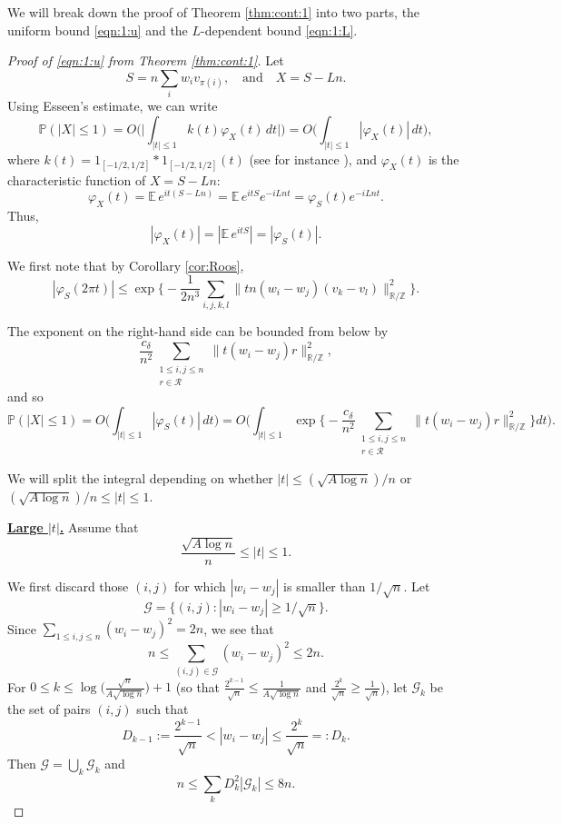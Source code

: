 \documentclass[reqno]{amsart}
\newcommand\R{{\mathbb{R}}}
\newcommand\Z{{\mathbb{Z}}}
\renewcommand\P{{\mathbb{P}}}
\newcommand\CG{{\mathcal G}}
\newcommand\CR{{\mathcal R}}
\theoremstyle{plain}
\theoremstyle{definition}
\begin{document}
We will break down the proof of Theorem \ref{thm:cont:1} into two parts, the uniform bound \eqref{eqn:1:u} and the $L$-dependent bound \eqref{eqn:1:L}.

\begin{proof}[Proof of \eqref{eqn:1:u} from Theorem \ref{thm:cont:1}]
Let 
\[
S = n\sum_{i} w_{i} v_{\pi(i)}, \quad \text{and} \quad X = S - L n.
\]
Using Esseen's estimate, we can write
\begin{equation}\label{eqn:kt}
\P(|X| \le 1) 
=O\Big( \Big| \int_{|t| \le 1} k(t)\varphi_{X}(t) \, dt \Big| \Big)
=O\Big( \int_{|t| \le 1} |\varphi_{X}(t)| \, dt\Big),
\end{equation}
where $k(t) = 1_{[-1/2, 1/2]} * 1_{[-1/2, 1/2]}(t)$ (see for instance \cite{NVsur}), and $\varphi_{X}(t)$ is the characteristic function of $X = S - L n$:
\[
\varphi_{X}(t) = \mathbb{E} \, e^{i t (S - L n)} = \mathbb{E} \, e^{i t S} e^{- i L n t} = \varphi_{S}(t) e^{- i L n t}.
\]
Thus,
\[
|\varphi_{X}(t)| = |\mathbb{E} \, e^{it S}| = |\varphi_{S}(t)|.
\]

We first note that by Corollary \ref{cor:Roos},
\[
|\varphi_{S}(2\pi t)| \le \exp\Big\{ - \frac{1}{2n^{3}} \sum_{i,j,k,l} \| tn (w_{i} - w_{j}) (v_{k} - v_{l}) \|_{\R/\Z}^{2} \Big\}.
\]

The exponent on the right-hand side can be bounded from below by
\[
\frac{c_{\delta}}{n^{2}} \sum_{\substack{1 \le i,j \le n \\ r\in \CR}} \| t (w_{i} - w_{j}) r \|_{\R/\Z}^{2},
\]
and so
\begin{equation}\label{eqn:int:1}
\P(|X| \le 1) =O\Big(\int_{|t| \le 1} |\varphi_{S}(t)| \, dt\Big)
=O\Big(\int_{|t| \le 1} \exp\Big\{ -\frac{c_{\delta}}{n^{2}} \sum_{\substack{1 \le i,j \le n \\ r\in \CR}} \| t (w_{i} - w_{j}) r \|_{\R/\Z}^{2} \Big\} dt\Big).
\end{equation}

We will split the integral depending on whether $|t| \le (\sqrt{A\log n})/n$ or $(\sqrt{A\log n})/n \le |t| \le 1$. 

\underline{\bf Large $|t|$.} Assume that $$\frac{\sqrt{A\log n}}{n} \le |t| \le 1.$$

We first discard those $(i,j)$ for which $|w_{i} - w_{j}|$ is
smaller than $1/\sqrt{n}$. Let
\[
\CG = \{ (i,j) : |w_{i} - w_{j}| \ge 1/\sqrt{n} \}.
\]
Since $\sum_{1\le i,j\le n}(w_{i}-w_{j})^2=2n$, we see that
\[
n \le \sum_{(i,j) \in \CG} (w_{i} - w_{j})^{2} \le 2n.
\]
For $0 \le k \le \log \Big( \frac{\sqrt{n}}{A \sqrt{\log n}} \Big)+1$ (so that $\frac{2^{k-1}}{\sqrt{n}} \le \frac{1}{A\sqrt{\log n}}$ and $\frac{2^{k}}{\sqrt{n}}\ge \frac{1}{\sqrt{n}}$), let $\CG_{k}$ be the set of pairs $(i,j)$ such that
\[
D_{k-1} := \frac{2^{k-1}}{\sqrt{n}} < |w_{i} - w_{j}| \le \frac{2^{k}}{\sqrt{n}} =: D_{k}.
\]
Then $\CG=\bigcup_{k}\CG_{k}$ and
\[
n \le \sum_{k} D_{k}^{2} |\CG_{k}| \le 8n.
\]


\end{proof}
\end{document}
